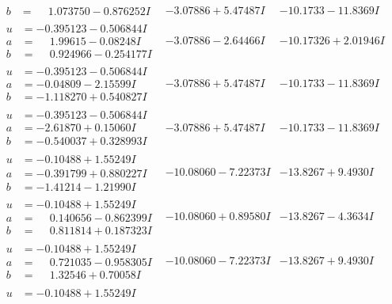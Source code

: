 \documentclass[1p]{elsarticle_modified}
\theoremstyle{definition}
\begin{document}
$$\begin{array}{c|c|c}
\begin{aligned}
b &= \phantom{-}1.073750 - 0.876252 I\end{aligned}
 & -3.07886 + 5.47487 I & -10.1733 - 11.8369 I \\ \hline\begin{aligned}
u &= -0.395123 - 0.506844 I \\
a &= \phantom{-}1.99615 - 0.08248 I \\
b &= \phantom{-}0.924966 - 0.254177 I\end{aligned}
 & -3.07886 - 2.64466 I & -10.17326 + 2.01946 I \\ \hline\begin{aligned}
u &= -0.395123 - 0.506844 I \\
a &= -0.04809 - 2.15599 I \\
b &= -1.118270 + 0.540827 I\end{aligned}
 & -3.07886 + 5.47487 I & -10.1733 - 11.8369 I \\ \hline\begin{aligned}
u &= -0.395123 - 0.506844 I \\
a &= -2.61870 + 0.15060 I \\
b &= -0.540037 + 0.328993 I\end{aligned}
 & -3.07886 + 5.47487 I & -10.1733 - 11.8369 I \\ \hline\begin{aligned}
u &= -0.10488 + 1.55249 I \\
a &= -0.391799 + 0.880227 I \\
b &= -1.41214 - 1.21990 I\end{aligned}
 & -10.08060 - 7.22373 I & -13.8267 + 9.4930 I \\ \hline\begin{aligned}
u &= -0.10488 + 1.55249 I \\
a &= \phantom{-}0.140656 - 0.862399 I \\
b &= \phantom{-}0.811814 + 0.187323 I\end{aligned}
 & -10.08060 + 0.89580 I & -13.8267 - 4.3634 I \\ \hline\begin{aligned}
u &= -0.10488 + 1.55249 I \\
a &= \phantom{-}0.721035 - 0.958305 I \\
b &= \phantom{-}1.32546 + 0.70058 I\end{aligned}
 & -10.08060 - 7.22373 I & -13.8267 + 9.4930 I \\ \hline\begin{aligned}
u &= -0.10488 + 1.55249 I \\

\end{aligned}
\end{array}$$
\end{document}
